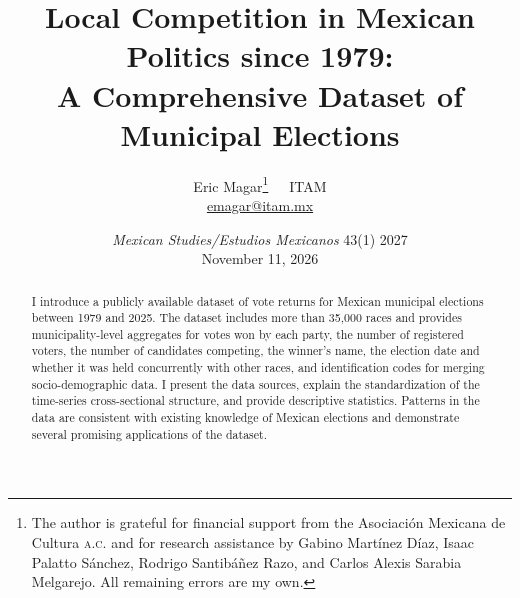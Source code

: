 \documentclass[letter,12pt]{article}
\begin{document}
\title{Local Competition in Mexican Politics since 1979: \\ A Comprehensive Dataset of Municipal Elections}
\author{Eric Magar\footnote{The author is grateful for financial support from the Asociación Mexicana de Cultura \textsc{a.c.} and for research assistance by Gabino Martínez Díaz, Isaac Palatto Sánchez, Rodrigo Santibáñez Razo, and Carlos Alexis Sarabia Melgarejo. All remaining errors are my own.}~~~ITAM \\ \url{emagar@itam.mx}}
\date{\emph{Mexican Studies/Estudios Mexicanos} 43(1) 2027 \\ November 11, 2026}
\maketitle

\begin{abstract}
\noindent I introduce a publicly available dataset of vote returns for Mexican municipal elections between 1979 and 2025. The dataset includes more than 35,000 races and provides municipality-level aggregates for votes won by each party, the number of registered voters, the number of candidates competing, the winner's name, the election date and whether it was held concurrently with other races, and identification codes for merging socio-demographic data. I present the data sources, explain the standardization of the time-series cross-sectional structure, and provide descriptive statistics. Patterns in the data are consistent with existing knowledge of Mexican elections and demonstrate several promising applications of the dataset.
\end{abstract}
\end{document}
